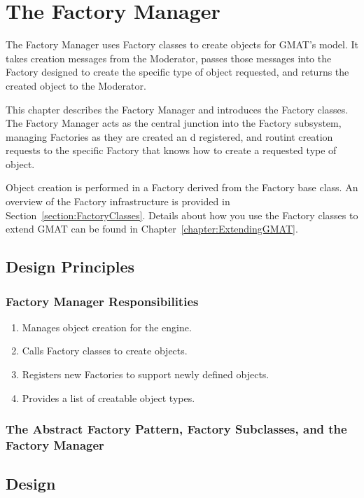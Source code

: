 \chapter{\label{chapter:FactoryManager}The Factory Manager}

The Factory Manager uses Factory classes to create objects for GMAT's model.  It takes creation
messages from the Moderator, passes those messages into the Factory designed to create the specific
type of object requested, and returns the created object to the Moderator.

This chapter describes the Factory Manager and introduces the Factory classes.  The Factory Manager
acts as the central junction into the Factory subsystem, managing Factories as they are created an
d registered, and routint creation requests to the specific Factory that knows how to create
a requested type of object.

Object creation is performed in a Factory derived from the Factory base class. An overview of the
Factory infrastructure is provided in Section~\ref{section:FactoryClasses}. Details about how you
use the Factory classes to extend GMAT can be found in Chapter~\ref{chapter:ExtendingGMAT}.

\section{Design Principles}

\subsection{Factory Manager Responsibilities}

\begin{enumerate}
\item Manages object creation for the engine.
\item Calls Factory classes to create objects.
\item Registers new Factories to support newly defined objects.
\item Provides a list of creatable object types.
\end{enumerate}

\subsection{The Abstract Factory Pattern, Factory Subclasses, and the Factory Manager}

\section{Design}

